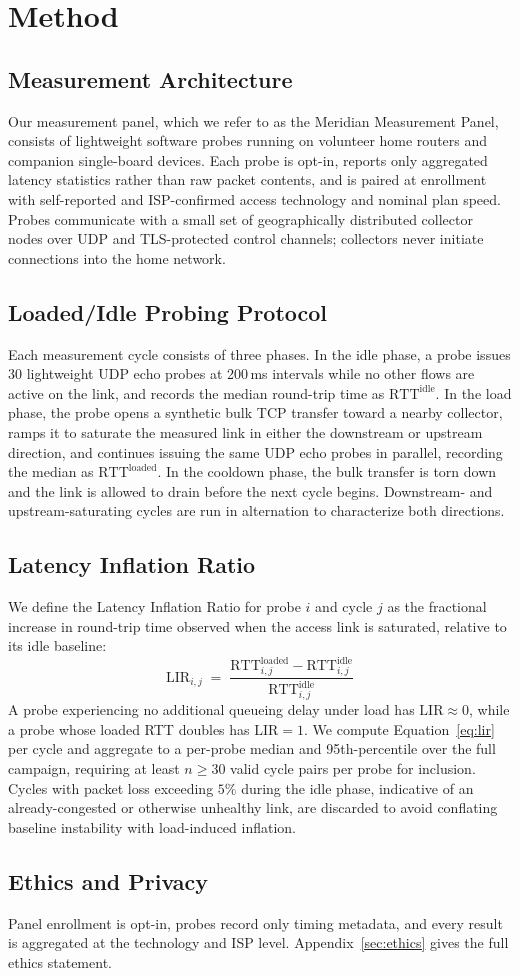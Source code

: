 \section{Method}
\label{sec:method}
\subsection{Measurement Architecture}
Our measurement panel, which we refer to as the Meridian Measurement Panel, consists of
lightweight software probes running on volunteer home routers and companion single-board
devices. Each probe is opt-in, reports only aggregated latency statistics rather than raw
packet contents, and is paired at enrollment with self-reported and ISP-confirmed access
technology and nominal plan speed. Probes communicate with a small set of geographically
distributed collector nodes over UDP and TLS-protected control channels; collectors never
initiate connections into the home network.

\subsection{Loaded/Idle Probing Protocol}
Each measurement cycle consists of three phases. In the idle phase, a probe issues 30
lightweight UDP echo probes at 200\,ms intervals while no other flows are active on the
link, and records the median round-trip time as $\mathrm{RTT}^{\text{idle}}$. In the load
phase, the probe opens a synthetic bulk TCP transfer toward a nearby collector, ramps it
to saturate the measured link in either the downstream or upstream direction, and
continues issuing the same UDP echo probes in parallel, recording the median as
$\mathrm{RTT}^{\text{loaded}}$. In the cooldown phase, the bulk transfer is torn down and
the link is allowed to drain before the next cycle begins. Downstream- and
upstream-saturating cycles are run in alternation to characterize both directions.

\subsection{Latency Inflation Ratio}
We define the Latency Inflation Ratio for probe $i$ and cycle $j$ as the fractional
increase in round-trip time observed when the access link is saturated, relative to its
idle baseline:
\begin{equation}
  \mathrm{LIR}_{i,j} \;=\; \frac{\mathrm{RTT}_{i,j}^{\text{loaded}} - \mathrm{RTT}_{i,j}^{\text{idle}}}{\mathrm{RTT}_{i,j}^{\text{idle}}}
  \label{eq:lir}
\end{equation}
A probe experiencing no additional queueing delay under load has $\mathrm{LIR}\approx 0$,
while a probe whose loaded RTT doubles has $\mathrm{LIR}=1$. We compute
Equation~\eqref{eq:lir} per cycle and aggregate to a per-probe median and 95th-percentile
over the full campaign, requiring at least $n \geq 30$ valid cycle pairs per probe for
inclusion. Cycles with packet loss exceeding $5\%$ during the idle phase, indicative of an
already-congested or otherwise unhealthy link, are discarded to avoid conflating baseline
instability with load-induced inflation.

\subsection{Ethics and Privacy}
Panel enrollment is opt-in, probes record only timing metadata, and every result is
aggregated at the technology and ISP level. Appendix~\ref{sec:ethics} gives the full
ethics statement.
